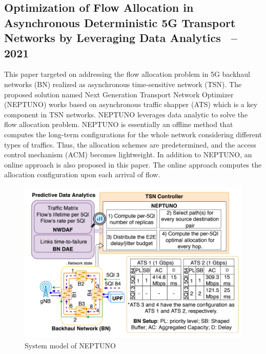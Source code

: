 \documentclass[12pt]{article}
\begin{document}
\subsection{Optimization of Flow Allocation in Asynchronous Deterministic 5G Transport Networks by Leveraging Data Analytics~\cite{prados2021optimization} -- 2021}

This paper targeted on addressing the flow allocation problem in 5G backhaul networks (BN) realized as asynchronous time-sensitive network (TSN). The proposed solution named Next Generation Transport Network Optimizer (NEPTUNO) works based on asynchronous traffic shapper (ATS) which is a key component in TSN networks.  NEPTUNO leverages data analytic to solve the flow allocation problem. NEPTUNO is essentially an offline method that computes the long-term configurations for the whole network considering different types of traffics. Thus, the allocation schemes are predetermined, and the access control mechanism (ACM) becomes lightweight. In addition to NEPTUNO, an online approach is also proposed in this paper. The online approach computes the allocation configuration upon each arrival of flow. 

\begin{figure}
    \centering
    \includegraphics[width=.6\columnwidth]{Figures/NEPTUNO.png}
    \caption{System model of NEPTUNO}
    \label{fig:NEPTUNO}
\end{figure}
\end{document}
